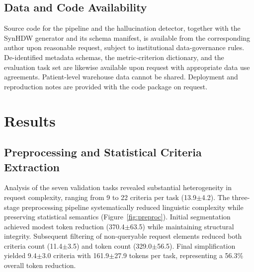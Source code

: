 \documentclass[applsci,article,submit,pdftex,oneauthor]{Definitions/mdpi}
\begin{document}
\subsection{Data and Code Availability}
Source code for the pipeline and the hallucination detector, together with the
SynHDW generator and its schema manifest, is available from the corresponding
author upon reasonable request, subject to institutional data-governance rules.
De-identified metadata schemas, the metric-criterion dictionary, and the
evaluation task set are likewise available upon request with appropriate data
use agreements. Patient-level warehouse data cannot be shared. Deployment and
reproduction notes are provided with the code package on request.

\section{Results}

\subsection{Preprocessing and Statistical Criteria Extraction}
Analysis of the seven validation tasks revealed substantial heterogeneity in
request complexity, ranging from 9 to 22 criteria per task (13.9$\pm$4.2). The
three-stage preprocessing pipeline systematically reduced linguistic complexity
while preserving statistical semantics (Figure~\ref{fig:preproc}). Initial
segmentation achieved modest token reduction (370.4$\pm$63.5) while maintaining
structural integrity. Subsequent filtering of non-queryable request elements
reduced both criteria count (11.4$\pm$3.5) and token count (329.0$\pm$56.5).
Final simplification yielded 9.4$\pm$3.0 criteria with 161.9$\pm$27.9 tokens per
task, representing a 56.3\% overall token reduction.
\end{document}
